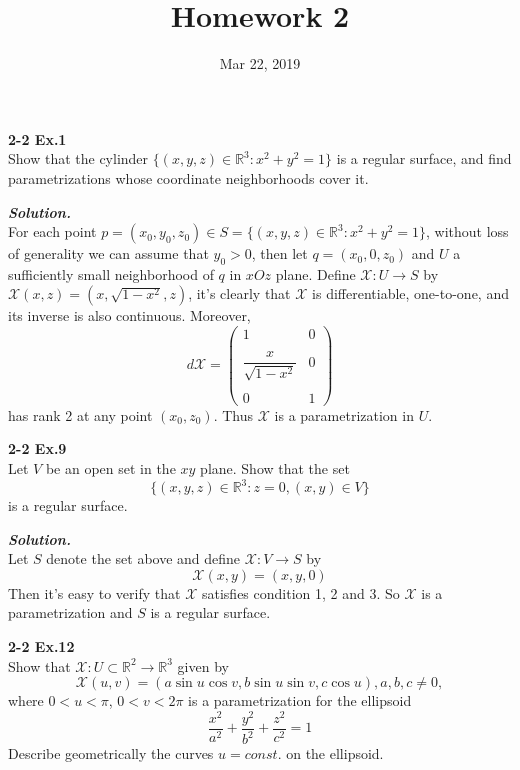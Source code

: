\documentclass{article}
\begin{document}
\title{Homework 2}
\date{Mar 22, 2019}
\maketitle

\setlength\parindent{0em}   %
\setlength\parskip{1.0\baselineskip} %

\par
\textbf{2-2 Ex.1}\\
Show that the cylinder $\{(x,y,z) \in \mathbb{R}^3: x^2+y^2=1\}$ is a regular surface, and find parametrizations whose
coordinate neighborhoods cover it.

\par
\textbf{\textit{Solution.}}\\
For each point $p = (x_0, y_0, z_0) \in S = \{(x,y,z) \in \mathbb{R}^3: x^2+y^2=1\}$, without loss of generality we can 
assume that $y_0 > 0$, then let $q = (x_0, 0, z_0)$ and $U$ a sufficiently small neighborhood of $q$ in $xOz$ plane.
Define $\mathcal{X}: U \to S$ by $\mathcal{X}(x,z)=(x,\sqrt{1-x^2}, z)$, it's clearly that
$\mathcal{X}$ is differentiable, one-to-one, and its inverse is also continuous. Moreover,
$$
    d\mathcal{X} = 
    \left(
        \begin{array}{cc}
            1 & 0\\\\
            \dfrac{x}{\sqrt{1-x^2}} & 0\\\\
            0 & 1
        \end{array}
    \right)
$$
has rank 2 at any point $(x_0, z_0)$. Thus $\mathcal{X}$ is a parametrization in $U$. \qedsymbol

\par
\textbf{2-2 Ex.9}\\
Let $V$ be an open set in the $xy$ plane. Show that the set
$$
    \{(x,y,z) \in \mathbb{R}^3: z=0,(x,y) \in V\}
$$
is a regular surface.\\

\par
\textbf{\textit{Solution.}}\\
Let $S$ denote the set above and define $\mathcal{X}: V \to S$ by
$$
    \mathcal{X}(x,y) = (x,y,0)
$$
Then it's easy to verify that $\mathcal{X}$ satisfies condition 1, 2 and 3. So $\mathcal{X}$ is
a parametrization and $S$ is a regular surface. \qedsymbol

\par
\textbf{2-2 Ex.12}\\
Show that $\mathcal{X}: U \subset \mathbb{R}^2 \to \mathbb{R}^3$ given by 
$$
    \mathcal{X}(u,v) = (a \sin u \cos v, b \sin u \sin v, c \cos u), a, b, c \neq 0,
$$
where $0<u<\pi$, $0<v<2 \pi$ is a parametrization for the ellipsoid
$$
    \frac{x^2}{a^2} + \frac{y^2}{b^2} + \frac{z^2}{c^2} = 1
$$
Describe geometrically the curves $u = const.$ on the ellipsoid.\\
\end{document}
